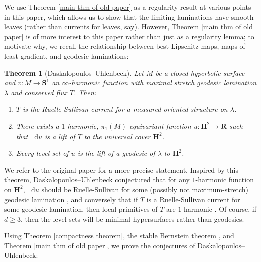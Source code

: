 \documentclass[final,12pt, leqno]{brownthesis}
\newcommand{\RR}{\mathbf{R}}
\newcommand{\Hyp}{\mathbf H}
\newcommand{\Sph}{\mathbf S}
\newcommand*\dif{\mathop{}\!\mathrm{d}}
\newtheorem{theorem}{Theorem}[section]
\theoremstyle{definition}
\numberwithin{equation}{section}
\begin{document}
We use Theorem \ref{main thm of old paper} as a regularity result at various points in this paper, which allows us to show that the limiting laminations have smooth leaves (rather than currents for leaves, say).
However, Theorem \ref{main thm of old paper} is of more interest to this paper rather than just as a regularity lemma; to motivate why, we recall the relationship between best Lipschitz maps, maps of least gradient, and geodesic laminations:

\begin{theorem}[Daskalopoulos--Uhlenbeck]\label{DU theorem}
Let $M$ be a closed hyperbolic surface and $v: M \to \Sph^1$ an $\infty$-harmonic function with maximal stretch geodesic lamination $\lambda$ and conserved flux $T$. Then:
\begin{enumerate}
\item $T$ is the Ruelle-Sullivan current for a measured oriented structure on $\lambda$.
\item There exists a $1$-harmonic, $\pi_1(M)$-equivariant function $u: \Hyp^2 \to \RR$ such that $\dif u$ is a lift of $T$ to the universal cover $\Hyp^2$.
\item Every level set of $u$ is the lift of a geodesic of $\lambda$ to $\Hyp^2$.
\end{enumerate}
\end{theorem}

We refer to the original paper \cite{daskalopoulos2020transverse} for a more precise statement.
Inspired by this theorem, Daskalopoulos--Uhlenbeck conjectured that for any $1$-harmonic function on $\Hyp^2$, $\dif u$ should be Ruelle-Sullivan for some (possibly not maximum-stretch) geodesic lamination \cite[Problem 9.4]{daskalopoulos2020transverse}, and conversely that if $T$ is a Ruelle-Sullivan current for some geodesic lamination, then local primitives of $T$ are $1$-harmonic \cite[Conjecture 9.5]{daskalopoulos2020transverse}.
Of course, if $d \geq 3$, then the level sets will be minimal hypersurfaces rather than geodesics.

Using Theorem \ref{compactness theorem}, the stable Bernstein theorem \cite{Schoen2016, Chodosh2021}, and Theorem \ref{main thm of old paper}, we prove the conjectures of Daskalopoulos--Uhlenbeck:
\end{document}
